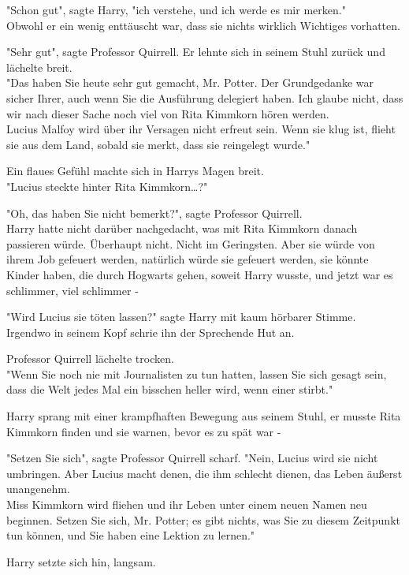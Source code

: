 {"Schon gut", sagte Harry, "ich verstehe, und ich werde es mir merken."\\ Obwohl er ein wenig enttäuscht war, dass sie nichts wirklich Wichtiges vorhatten.

"Sehr gut", sagte Professor Quirrell. Er lehnte sich in seinem Stuhl zurück und lächelte breit.\\ "Das haben Sie heute sehr gut gemacht, Mr. Potter. Der Grundgedanke war sicher Ihrer, auch wenn Sie die Ausführung delegiert haben. Ich glaube nicht, dass wir nach dieser Sache noch viel von Rita Kimmkorn hören werden.\\ Lucius Malfoy wird über ihr Versagen nicht erfreut sein. Wenn sie klug ist, flieht sie aus dem Land, sobald sie merkt, dass sie reingelegt wurde."

Ein flaues Gefühl machte sich in Harrys Magen breit.\\ "Lucius steckte hinter Rita Kimmkorn…?"

"Oh, das haben Sie nicht bemerkt?", sagte Professor Quirrell.\\ Harry hatte nicht darüber nachgedacht, was mit Rita Kimmkorn danach passieren würde. Überhaupt nicht. Nicht im Geringsten. Aber sie würde von ihrem Job gefeuert werden, natürlich würde sie gefeuert werden, sie könnte Kinder haben, die durch Hogwarts gehen, soweit Harry wusste, und jetzt war es schlimmer, viel schlimmer -

"Wird Lucius sie töten lassen?" sagte Harry mit kaum hörbarer Stimme.\\ Irgendwo in seinem Kopf schrie ihn der Sprechende Hut an.

Professor Quirrell lächelte trocken.\\ "Wenn Sie noch nie mit Journalisten zu tun hatten, lassen Sie sich gesagt sein, dass die Welt jedes Mal ein bisschen heller wird, wenn einer stirbt."

Harry sprang mit einer krampfhaften Bewegung aus seinem Stuhl, er musste Rita Kimmkorn finden und sie warnen, bevor es zu spät war -

"Setzen Sie sich", sagte Professor Quirrell scharf. "Nein, Lucius wird sie nicht umbringen. Aber Lucius macht denen, die ihm schlecht dienen, das Leben äußerst unangenehm.\\ Miss Kimmkorn wird fliehen und ihr Leben unter einem neuen Namen neu beginnen. Setzen Sie sich, Mr. Potter; es gibt nichts, was Sie zu diesem Zeitpunkt tun können, und Sie haben eine Lektion zu lernen."

Harry setzte sich hin, langsam.

}
